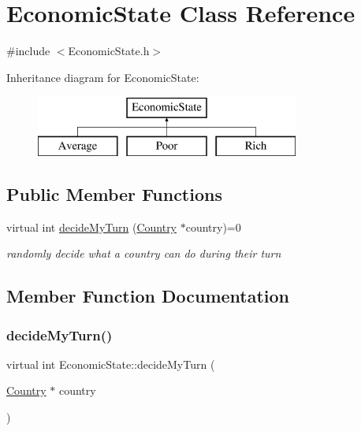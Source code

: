 \hypertarget{class_economic_state}{}\section{Economic\+State Class Reference}
\label{class_economic_state}


{\ttfamily \#include $<$Economic\+State.\+h$>$}

Inheritance diagram for Economic\+State\+:\begin{figure}[H]
\begin{center}
\leavevmode
\includegraphics[height=2.000000cm]{class_economic_state}
\end{center}
\end{figure}
\subsection*{Public Member Functions}
\begin{DoxyCompactItemize}
\item 
virtual int \mbox{\hyperlink{class_economic_state_aedab93435d9f685c76b9eb327c04e0ad}{decide\+My\+Turn}} (\mbox{\hyperlink{class_country}{Country}} $\ast$country)=0
\begin{DoxyCompactList}\small\item\em randomly decide what a country can do during their turn \end{DoxyCompactList}\end{DoxyCompactItemize}


\subsection{Member Function Documentation}
\mbox{\label{class_economic_state_aedab93435d9f685c76b9eb327c04e0ad}} 
\subsubsection{\texorpdfstring{decideMyTurn()}{decideMyTurn()}}
{\footnotesize\ttfamily virtual int Economic\+State\+::decide\+My\+Turn (\begin{DoxyParamCaption}\item[{\mbox{\hyperlink{class_country}{Country}} $\ast$}]{country }\end{DoxyParamCaption})\hspace{0.3cm}{\ttfamily [pure virtual]}}



